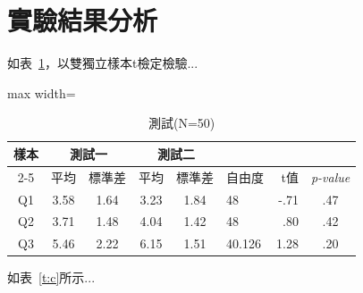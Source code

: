 \documentclass[12pt,a4paper,oneside]{book}
\begin{document}
\section{實驗結果分析}

如表~\ref{t:b}，以雙獨立樣本t檢定檢驗...

\begin{table}[htbp]
\centering
\caption{測試(N=50)}
\label{t:b}
\begin{adjustbox}{max width=\textwidth}
\begin{tabular}{@{}ccccclrc@{}}
\toprule
 \multirow{2}[3]{*}{樣本} & \multicolumn{2}{c}{測試一} & \multicolumn{2}{c}{測試二} &  &  &  \\ \cmidrule(lr){2-5}
 & 平均 & 標準差 & 平均 & 標準差 & 自由度 & t值 & \textit{p-value} \\ \midrule
Q1 & 3.58 & 1.64 & 3.23 & 1.84 & 48 & -.71 & .47 \\
Q2 & 3.71 & 1.48 & 4.04 & 1.42 & 48 & .80 & .42 \\
Q3 & 5.46 & 2.22 & 6.15 & 1.51 & 40.126 & 1.28 & .20 \\ \bottomrule
\end{tabular}
\end{adjustbox}
\end{table}

如表~\ref{t:c}所示...
\end{document}
